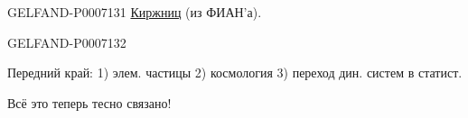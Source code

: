 \begin{GelfandAdjacentEvidence}{GELFAND-P000713}{1}
\underline{Киржниц}  (из ФИАН’а).


\end{GelfandAdjacentEvidence}
\begin{GelfandAdjacentEvidence}{GELFAND-P000713}{2}

Передний край: 1) элем. частицы 2) космология 3) переход дин. систем в статист.

Всё это теперь тесно связано!

\end{GelfandAdjacentEvidence}
